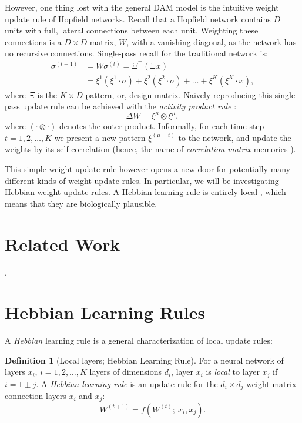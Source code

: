 \documentclass[nobib]{tufte-handout}
\theoremstyle{definition}
\newtheorem{definition}{Definition}
\begin{document}
However, one thing lost with the general DAM model is the intuitive
weight update rule of Hopfield networks. Recall that a Hopfield network
contains $D$ units with full, lateral connections between each unit. Weighting
these connections is a $D \times D$ matrix, $W$, with a vanishing diagonal,
as the network has no recursive connections. Single-pass recall for the 
traditional network is:
\begin{align}
    \sigma^{(t+1)} &= W \sigma^{(t)} = \Xi^\top (\Xi x) \\
        &= \xi^1 (\xi^1 \cdot \sigma) + \xi^2 (\xi^2 \cdot \sigma) + \dots + \xi^K (\xi^K \cdot x) \nonumber,
\end{align}\label{hopfield:singlepass}
where $\Xi$ is the $K \times D$ pattern, or, design matrix. Naively reproducing
this single-pass update rule can be achieved with the \textit{activity product rule}
\parencite{haykin_neural_2009}:
\begin{equation}
    \Delta W = \xi^\mu \otimes \xi^\mu,
\end{equation}
where $(\cdot \otimes \cdot)$ denotes the outer product. Informally, for each
time step $t = 1, 2, \dots, K$ we present a new pattern $\xi^{(\mu = t)}$
to the network, and update the weights by its self-correlation (hence, the 
name of \textit{correlation matrix} memories \parencite{kohonen_correlation_1988}).

This simple weight update rule however opens a new door for potentially
many different kinds of weight update rules. In particular, we will be 
investigating Hebbian weight update rules. A Hebbian learning rule is entirely
local \parencite{gerstner_mathematical_2002}, which means that they are biologically
plausible. 

\section{Related Work}

\parencites{kozachkov_neuron-astrocyte_2024,hu_provably_2024,salvatori_associative_2024,hoover_dense_2024}.

\section{Hebbian Learning Rules}

A \textit{Hebbian} learning rule is a general characterization of local 
update rules:
\begin{definition}[Local layers; Hebbian Learning Rule]\label{def:hebb-learning}
    For a neural network of layers $x_i$, $i = 1, 2, \dots, K$ layers of
    dimensions $d_i$, layer $x_i$ is \textit{local} to layer $x_j$ if 
    $i = 1 \pm j$. A \textit{Hebbian learning rule} is an update rule
    for the $d_i \times d_j$ weight matrix connection layers $x_i$ and
    $x_j$:
    $$
    W^{(t+1)} = f(W^{(t)};~x_i, x_j).
    $$
\end{definition}
\end{document}
